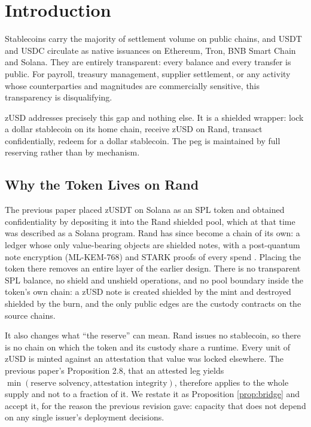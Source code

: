 \documentclass[11pt,a4paper]{article}
\begin{document}
\tableofcontents
\newpage

\section{Introduction}

Stablecoins carry the majority of settlement volume on public chains, and USDT and USDC circulate as native issuances on Ethereum, Tron, BNB Smart Chain and Solana. They are entirely transparent: every balance and every transfer is public. For payroll, treasury management, supplier settlement, or any activity whose counterparties and magnitudes are commercially sensitive, this transparency is disqualifying.

zUSD addresses precisely this gap and nothing else. It is a shielded wrapper: lock a dollar stablecoin on its home chain, receive zUSD on Rand, transact confidentially, redeem for a dollar stablecoin. The peg is maintained by full reserving rather than by mechanism.

\subsection{Why the Token Lives on Rand}

The previous paper placed zUSDT on Solana as an SPL token and obtained confidentiality by depositing it into the Rand shielded pool, which at that time was described as a Solana program. Rand has since become a chain of its own: a ledger whose only value-bearing objects are shielded notes, with a post-quantum note encryption (ML-KEM-768) and STARK proofs of every spend \cite{rand,randimpl}. Placing the token there removes an entire layer of the earlier design. There is no transparent SPL balance, no shield and unshield operations, and no pool boundary inside the token's own chain: a zUSD note is created shielded by the mint and destroyed shielded by the burn, and the only public edges are the custody contracts on the source chains.

It also changes what ``the reserve'' can mean. Rand issues no stablecoin, so there is no chain on which the token and its custody share a runtime. Every unit of zUSD is minted against an attestation that value was locked elsewhere. The previous paper's Proposition 2.8, that an attested leg yields $\min(\text{reserve solvency}, \text{attestation integrity})$, therefore applies to the whole supply and not to a fraction of it. We restate it as Proposition \ref{prop:bridge} and accept it, for the reason the previous revision gave: capacity that does not depend on any single issuer's deployment decisions.
\end{document}

